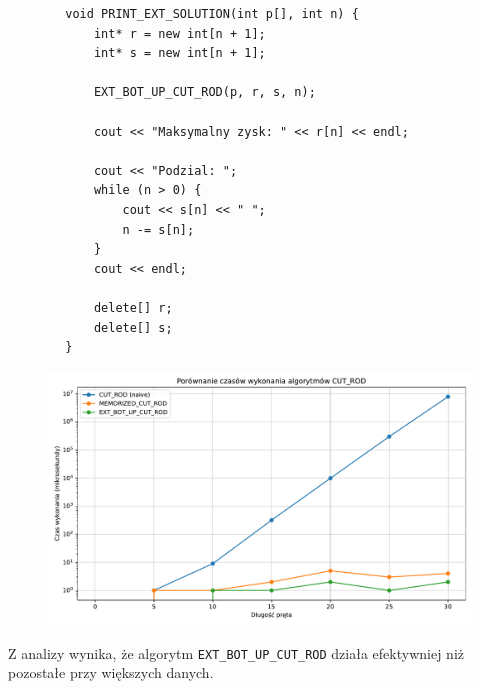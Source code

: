 \documentclass{article}
\begin{document}
	\begin{lstlisting}
		void PRINT_EXT_SOLUTION(int p[], int n) {
			int* r = new int[n + 1];
			int* s = new int[n + 1];
			
			EXT_BOT_UP_CUT_ROD(p, r, s, n);
			
			cout << "Maksymalny zysk: " << r[n] << endl;
			
			cout << "Podzial: ";
			while (n > 0) {
				cout << s[n] << " ";
				n -= s[n];
			}
			cout << endl;
			
			delete[] r; 
			delete[] s; 
		}
	\end{lstlisting}
	
	\begin{figure}[H]
		\centering
		\includegraphics[width=1\textwidth]{wykres1.pdf}
	\end{figure}
	
	Z analizy wynika, że algorytm \texttt{EXT\_BOT\_UP\_CUT\_ROD} działa efektywniej niż pozostałe przy większych danych.
	
	\begin{table}[H]
		\caption{Porównanie czasu działania algorytmów, dla danych o większym zakresie (mikrosekundy).}
		\label{tab:large_rod_cutting_times}
	\end{table}
	
\end{document}
